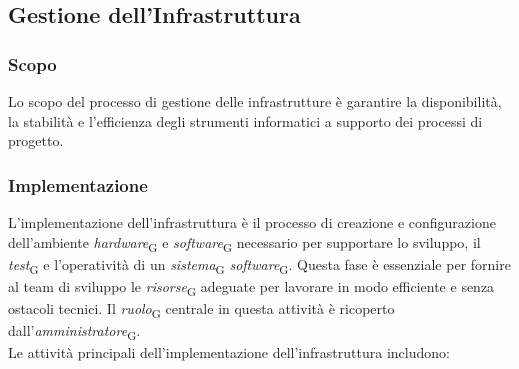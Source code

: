 \subsection{Gestione dell'Infrastruttura}
\subsubsection{Scopo}
Lo scopo del processo di gestione delle infrastrutture è garantire la disponibilità, la stabilità e l'efficienza degli strumenti informatici a supporto dei processi di progetto.

\subsubsection{Implementazione}
L’implementazione dell’infrastruttura è il processo di creazione e configurazione dell’ambiente \textit{hardware}\textsubscript{G} e \textit{software}\textsubscript{G} necessario per supportare lo sviluppo, il \textit{test}\textsubscript{G} e l’operatività di un \textit{sistema}\textsubscript{G} \textit{software}\textsubscript{G}. Questa fase è essenziale per fornire al team di sviluppo le \textit{risorse}\textsubscript{G} adeguate per lavorare in modo efficiente e senza ostacoli tecnici. Il \textit{ruolo}\textsubscript{G} centrale in questa attività è ricoperto dall’\textit{amministratore}\textsubscript{G}. \\
Le attività principali dell’implementazione dell’infrastruttura includono:
